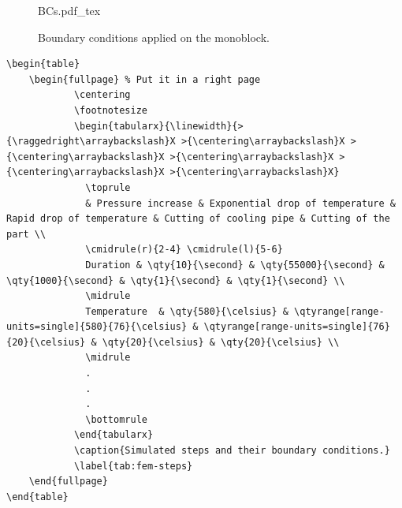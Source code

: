 \begin{figure}
	\begin{leftfullpage} %
	\centering
	\def\svgwidth{0.6\linewidth}
	{BCs.pdf_tex} %
	\caption[ boundary conditions.]{Boundary conditions applied on the monoblock.}
	\label{fig:boundary-conditions}
	\end{leftfullpage}
\end{figure}

\begin{lstlisting}[language={[LaTeX]TeX}]
\begin{table}
	\begin{fullpage} % Put it in a right page
			\centering
			\footnotesize
			\begin{tabularx}{\linewidth}{>{\raggedright\arraybackslash}X >{\centering\arraybackslash}X >{\centering\arraybackslash}X >{\centering\arraybackslash}X >{\centering\arraybackslash}X >{\centering\arraybackslash}X}
			  \toprule
			  & Pressure increase & Exponential drop of temperature & Rapid drop of temperature & Cutting of cooling pipe & Cutting of the part \\
			  \cmidrule(r){2-4} \cmidrule(l){5-6}
			  Duration & \qty{10}{\second} & \qty{55000}{\second} & \qty{1000}{\second} & \qty{1}{\second} & \qty{1}{\second} \\
			  \midrule
			  Temperature  & \qty{580}{\celsius} & \qtyrange[range-units=single]{580}{76}{\celsius} & \qtyrange[range-units=single]{76}{20}{\celsius} & \qty{20}{\celsius} & \qty{20}{\celsius} \\
			  \midrule
			  .
			  .
			  .
			  \bottomrule
			\end{tabularx}
			\caption{Simulated steps and their boundary conditions.}
			\label{tab:fem-steps}
	\end{fullpage}
\end{table}
\end{lstlisting}

